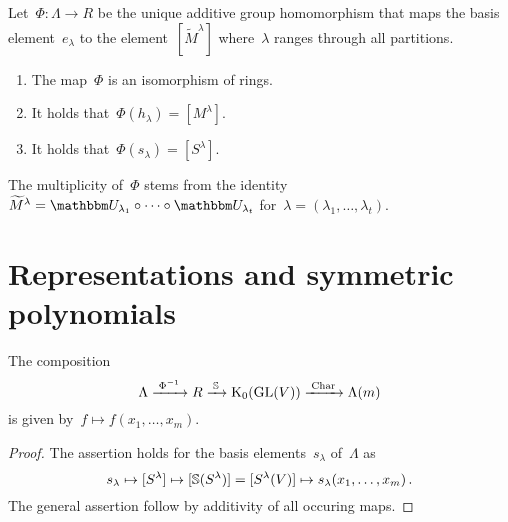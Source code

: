 \documentclass[a4paper,10pt]{scrartcl}
\begin{document}

\begin{theorem}
  Let~$\Phi \colon \Lambda \to R$ be the unique additive group homomorphism that maps the basis element~$e_\lambda$ to the element~$[\widetilde{M}^\lambda]$ where~$\lambda$ ranges through all partitions.
  \begin{enumerate}
    \item
      The map~$\Phi$ is an isomorphism of rings.
    \item
      It holds that~$\Phi(h_\lambda) = [M^\lambda]$.
    \item
      It holds that~$\Phi(s_\lambda) = [S^\lambda]$.
  \end{enumerate}
\end{theorem}

The multiplicity of~$\Phi$ stems from the identity~$\widetilde{M}^\lambda = \signrep_{\lambda_1} \circ \dotsb \circ \signrep_{\lambda_t}$ for~$\lambda = (\lambda_1, \dotsc, \lambda_t)$.





\section{Representations and symmetric polynomials}

\begin{corollary}
  The composition
  \[
    \Lambda
    \xrightarrow{\;\Phi^{-1}\;}
    R
    \xrightarrow{\;\mathbb{S}\;}
    \operatorname{K}_0(\operatorname{GL}(V))
    \xrightarrow{\;\operatorname{Char}\;}
    \Lambda(m)
  \]
  is given by~$f \mapsto f(x_1, \dotsc, x_m)$.
\end{corollary}

\begin{proof}
  The assertion holds for the basis elements~$s_\lambda$ of~$\Lambda$ as
  \[
    s_\lambda
    \mapsto
    [S^\lambda]
    \mapsto
    [\mathbb{S}(S^\lambda)]
    =
    [S^\lambda(V)]
    \mapsto
    s_\lambda(x_1, \dotsc, x_m) \,.
  \]
  The general assertion follow by additivity of all occuring maps.
\end{proof}
\end{document}
